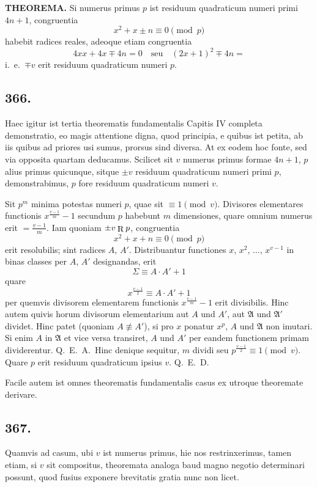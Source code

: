 \documentclass[12pt,a4paper]{article}
\begin{document}
\textbf{THEOREMA.} Si numerus primus $p$ ist residuum quadraticum numeri primi $4n+1$, congruentia
\[
x^2+x\pm n\equiv 0 \pmod{p}
\]
habebit radices reales, adeoque etiam congruentia
\[
4xx+4x\mp 4n=0 \quad \text{seu} \quad (2x+1)^2 \mp 4n=
\]
i.~e.~$\mp v$ erit residuum quadraticum numeri $p$.

\subsection*{366.}

Haec igitur ist tertia theorematis fundamentalis Capitis IV completa demonstratio, eo magis attentione digna, quod principia, e quibus ist petita, ab iis quibus ad priores usi sumus, prorsus sind diversa. At ex eodem hoc fonte, sed via opposita quartam deducamus. Scilicet sit $v$ numerus primus formae $4n+1$, $p$ alius primus quicunque, sitque $\pm v$ residuum quadraticum numeri primi $p$, demonstrabimus, $p$ fore residuum quadraticum numeri $v$.

Sit $p^m$ minima potestas numeri $p$, quae sit $\equiv 1\pmod{v}$. Divisores elementares functionis $x^{\frac{v-1}{m}}-1$ secundum $p$ habebunt $m$ dimensiones, quare omnium numerus erit $=\frac{v-1}{m}$. Iam quoniam $\pm v\mathbin{\raisebox{-1.5pt}{\smash{R}}}p$, congruentia
\[
x^2+x+n\equiv 0 \pmod{p}
\]
erit resolubilis; sint radices $A$, $A'$. Distribuantur functiones $x$, $x^2$, $\ldots$, $x^{v-1}$ in binas classes per $A$, $A'$ designandas, erit
\[
\Sigma\equiv A\cdot A'+1
\]
quare
\[
x^{\frac{v-1}{2}}\equiv A\cdot A'+1
\]
per quemvis divisorem elementarem functionis $x^{\frac{v-1}{m}}-1$ erit divisibilis. Hinc autem quivis horum divisorum elementarium aut $A$ und $A'$, aut $\mathfrak{A}$ und $\mathfrak{A}'$ dividet. Hinc patet (quoniam $A\not\equiv A'$), si pro $x$ ponatur $x^p$, $A$ und $\mathfrak{A}$ non imutari. Si enim $A$ in $\mathfrak{A}$ et vice versa transiret, $A$ und $A'$ per eandem functionem primam dividerentur. Q.~E.~A.~Hinc denique sequitur, $m$ dividi seu $p^{\frac{v-1}{2}}\equiv 1\pmod{v}$. Quare $p$ erit residuum quadraticum ipsius $v$. Q.~E.~D.

Facile autem ist omnes theorematis fundamentalis casus ex utroque theoremate derivare.

\subsection*{367.}

Quamvis ad casum, ubi $v$ ist numerus primus, hie nos restrinxerimus, tamen etiam, si $v$ sit compositus, theoremata analoga baud magno negotio determinari possunt, quod fusius exponere brevitatis gratia nunc non licet.
\end{document}
